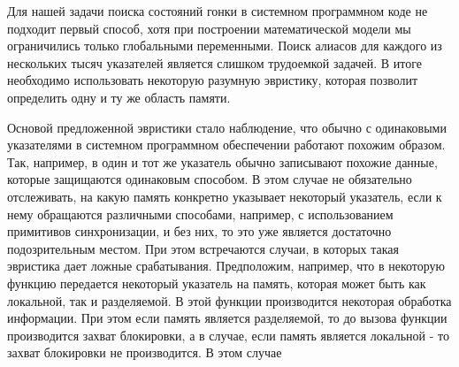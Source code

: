 Для нашей задачи поиска состояний гонки в системном программном коде не подходит первый способ, хотя при построении математической модели мы ограничились только глобальными переменными.
Поиск алиасов для каждого из нескольких тысяч указателей является слишком трудоемкой задачей.
В итоге необходимо использовать некоторую разумную эвристику, которая позволит определить одну и ту же область памяти. 

Основой предложенной эвристики стало наблюдение, что обычно с одинаковыми указателями в системном программном обеспечении работают похожим образом.
Так, например, в один и тот же указатель обычно записывают похожие данные, которые защищаются одинаковым способом.
В этом случае не обязательно отслеживать, на какую память конкретно указывает некоторый указатель, если к нему обращаются различными способами, например, с использованием примитивов синхронизации, и без них, то это уже является достаточно подозрительным местом.
При этом встречаются случаи, в которых такая эвристика дает ложные срабатывания. 
Предположим, например, что в некоторую функцию передается некоторый указатель на память, которая может быть как локальной, так и разделяемой. 
В этой функции производится некоторая обработка информации. При этом если память является разделяемой, то до вызова функции производится захват блокировки, а в случае, если память является локальной - то захват блокировки не производится.
В этом случае 

